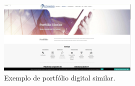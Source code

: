 \begin{figure}[H]
    \centering
    \includegraphics[width=0.6\textwidth]{Figures/trec.png} %
    \caption{Exemplo de portfólio digital similar.}
    \label{fig:exemplo2-portfolio}
\end{figure}










